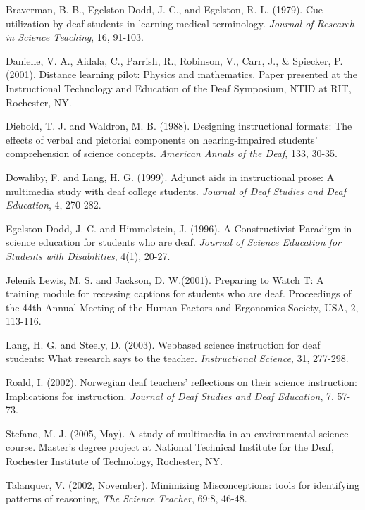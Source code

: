 \documentclass[11.5pt]{sig-alternate} %
\begin{document}
Braverman, B. B., Egelston-Dodd, J. C., and Egelston, R. L.  (1979). Cue utilization by deaf students in learning medical terminology.  \textit{Journal of Research in Science Teaching}, 16, 91-103. 
 
Danielle, V. A., Aidala, C., Parrish, R., Robinson, V., Carr, J., \& Spiecker, P.  (2001). Distance learning pilot:  Physics and mathematics.  Paper presented at the Instructional Technology and Education of the Deaf Symposium, NTID at RIT, Rochester, NY. 
 
Diebold, T. J. and Waldron, M. B.  (1988). Designing instructional formats:  The effects of verbal and pictorial components on hearing-impaired students’ comprehension of science concepts.  \textit{American Annals of the Deaf}, 133, 30-35. 
 
Dowaliby, F. and Lang, H. G.  (1999). Adjunct aids in instructional prose:  A multimedia study with deaf college students.  \textit{Journal of Deaf Studies and Deaf Education}, 4, 270-282. 
 
Egelston-Dodd, J. C. and Himmelstein, J.  (1996). A Constructivist Paradigm in science education for students who are deaf.  \textit{Journal of Science Education for Students with Disabilities}, 4(1), 20-27. 
 
Jelenik Lewis, M. S. and Jackson, D. W.(2001). Preparing to Watch T: A training module for recessing captions for students who are deaf.  Proceedings of the 44th Annual Meeting of the Human Factors and Ergonomics Society, USA, 2, 113-116. 
 
Lang, H. G. and Steely, D.  (2003). Webbased science instruction for deaf students:  What research says to the teacher. \textit{Instructional Science}, 31, 277-298. 
 
Roald, I.  (2002). Norwegian deaf teachers’ reflections on their science instruction:  Implications for instruction.  \textit{Journal of Deaf Studies and Deaf Education}, 7, 57-73. 
 
Stefano, M. J.  (2005, May).  A study of multimedia in an environmental science course.  Master’s degree project at National Technical Institute for the Deaf, Rochester Institute of Technology, Rochester, NY.  
 
Talanquer, V.  (2002, November).  Minimizing Misconceptions:  tools for identifying patterns of reasoning, \textit{The Science Teacher}, 69:8, 46-48.   
\end{document}

